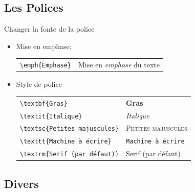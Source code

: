 
\subsection{Les Polices}

\begin{frame}[fragile]{Changer la fonte de la police}
  \begin{itemize}
      \item Mise en emphase:
      \begin{center}
      \begin{tabular}{ll}
      \lstinline|\emph{Emphase}| & Mise en \emph{emphase} du texte
      \end{tabular}
      \end{center}
  \item Style de police
  \begin{center}
  \begin{tabular}{ll}
  \lstinline|\textbf{Gras}| & \textbf{Gras} \\
  \lstinline|\textit{Italique}| & \textsl{Italique} \\
  \lstinline|\textsc{Petites majuscules}| & \textsc{Petites majuscules} \\
  \lstinline|\texttt{Machine à écrire}| & \texttt{Machine à écrire} \\
  \lstinline|\textrm{Serif (par défaut)}| & \textrm{Serif (par défaut)}
  \end{tabular}
  \end{center}
  \end{itemize}
\end{frame}

\subsection{Divers}

